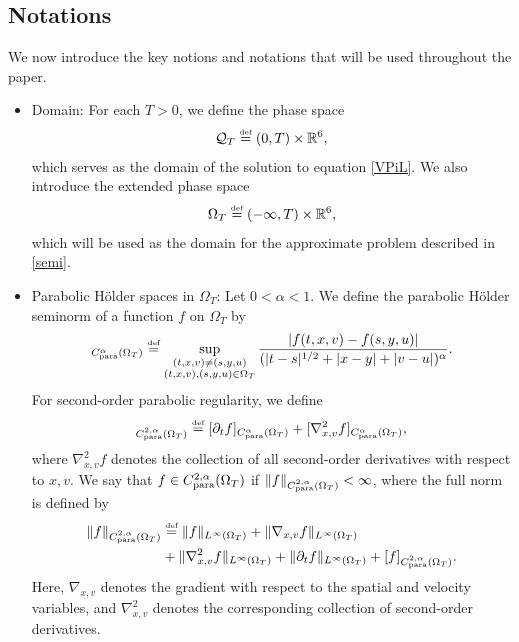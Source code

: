 \documentclass[reqno,11pt,final]{amsart}
\theoremstyle{plain}
\numberwithin{equation}{section}
\numberwithin{theorem}{section}
\newcommand{\eqdef }{\overset{\mbox{\tiny{def}}}{=}}
\begin{document}
\subsection{Notations}\label{notations}
We now introduce the key notions and notations that will be used throughout the paper.

\begin{itemize}%
\item Domain: For each $T>0$, we define the phase space 
\begin{align*}
\mathcal{Q}_T \eqdef (0,T)\times\mathbb{R}^6,
\end{align*}which serves as the domain of the solution to equation \eqref{VPiL}. We also introduce the extended phase space 
\begin{align*}
\Omega_T \eqdef  (-\infty, T)\times\mathbb{R}^6,
\end{align*}which will be used as the domain for the approximate problem described in \eqref{semi}.
\item Parabolic H\"older spaces in $\Omega_T$: Let $0<\alpha<1$. We define the parabolic H\"older seminorm of a function $f$ on $\Omega_T$ by
\begin{align*}
[f]_{C_\textup{para}^\alpha(\Omega_T)}  \eqdef \sup_{\substack{(t,x,v)\neq (s,y,u) \\ (t,x,v), (s,y,u)\in \Omega_T}} \frac{|f(t,x,v) - f(s,y,u)|}{(|t-s|^{1/2} + |x-y| + |v-u|)^\alpha}.
\end{align*}For second-order parabolic regularity, we define
\begin{align*}
[f]_{C_\textup{para}^{2,\alpha}(\Omega_T)}  \eqdef [\partial_tf]_{C_\textup{para}^\alpha(\Omega_T)} + [\nabla_{x,v}^2f]_{C_\textup{para}^\alpha(\Omega_T)},
\end{align*}where $\nabla_{x,v}^2f$ denotes the collection of all second-order derivatives with respect to $x,v$. We say that $f\in C^{2,\alpha}_\textup{para}(\Omega_T)$ if $\lVert f\rVert_{C_\textup{para}^{2,\alpha}(\Omega_T)} <\infty$, 
where the full norm is defined by
\begin{align*}
\lVert f\rVert_{C_\textup{para}^{2,\alpha}(\Omega_T)} &\eqdef \lVert f\rVert_{L^\infty(\Omega_T)} + \lVert \nabla_{x,v} f\rVert_{L^\infty(\Omega_T)} \\
&+\lVert \nabla_{x,v}^2f\rVert_{L^\infty(\Omega_T)} + \lVert \partial_tf \rVert_{L^\infty(\Omega_T)} + [f]_{C_\textup{para}^{2,\alpha}(\Omega_T)}.
\end{align*}
Here, $\nabla_{x,v}$ denotes the gradient with respect to the spatial and velocity variables, and $\nabla_{x,v}^2$ denotes the corresponding collection of second-order derivatives.

\end{itemize}
\end{document}
